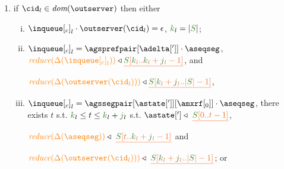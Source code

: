 \begin{definition}
\begin{enumerate}
%
%	


	
\item \label{prop_inclient} if $\cid_l \in \dom{\outserver}$ then either

    \begin{enumerate}[i.]
     \item ${\inclient}_l \cdot \outserver(\cid_l)  = \epsilon$, $\tknown_l = |\queuemessage|$; %

     \item ${\inclient}_l = \agsprefpair[{\adelta[']}]\cdot\aseqseg$,
      	$\ireduce{\igetdeltas{{\inclient}_l}}\triangleleft \flatten{ \queuemessage[\tknown_l..\tknown_l+\treceivebuffer_l-1]}$,  and
      
     	 $\ireduce{\igetdeltas{\outserver(\cid_l)}}\triangleleft 
      	 \flatten{\queuemessage[\tknown_l+\treceivebuffer_l..|\queuemessage| - 1]}$,
  
     \item ${\inclient}_l = \agssegpair[{\astate[']}][{\amxrf[_0]}]\cdot\aseqseg$,      
  		 there exists $t$ s.t. $\tknown_l\leq t \leq \tknown_l+\treceivebuffer_l$ s.t. $\astate['] \triangleleft \ \flatten{\queuemessage[0 .. t - 1]}$, 
    
    		 $\ireduce{\igetdeltas{\aseqseg}}\triangleleft \ \flatten{ \queuemessage[t..\tknown_l+\treceivebuffer_l-1]}$ and 
     
     		$\ireduce{\igetdeltas{\outserver(\cid_l) }}\triangleleft \
       				\flatten{\queuemessage[\tknown_l+\treceivebuffer_l..|\queuemessage| - 1]}$; or
      

\end{enumerate}
\end{enumerate}
\end{definition}
